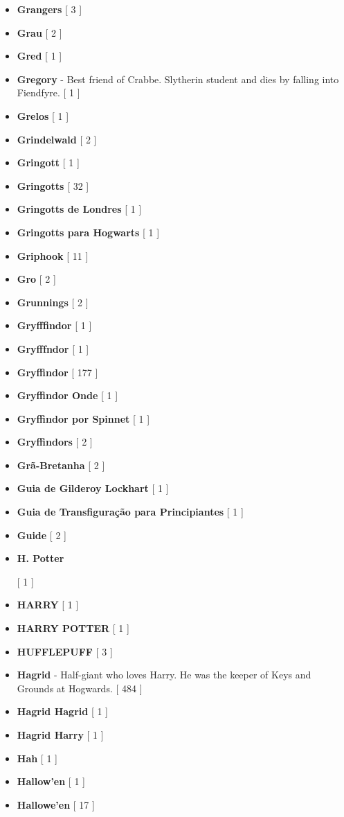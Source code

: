 \documentclass[a4paper]{article}
\begin{document}
{\begin{itemize}
	\item \textbf{Grangers} [ 3 ]
	\item \textbf{Grau} [ 2 ]
	\item \textbf{Gred} [ 1 ]
	\item \textbf{Gregory} - Best friend of Crabbe. Slytherin student and dies by falling into Fiendfyre. [ 1 ]
	\item \textbf{Grelos} [ 1 ]
	\item \textbf{Grindelwald} [ 2 ]
	\item \textbf{Gringott} [ 1 ]
	\item \textbf{Gringotts} [ 32 ]
	\item \textbf{Gringotts de Londres} [ 1 ]
	\item \textbf{Gringotts para Hogwarts} [ 1 ]
	\item \textbf{Griphook} [ 11 ]
	\item \textbf{Gro} [ 2 ]
	\item \textbf{Grunnings} [ 2 ]
	\item \textbf{Gryfffindor} [ 1 ]
	\item \textbf{Gryfffndor} [ 1 ]
	\item \textbf{Gryffindor} [ 177 ]
	\item \textbf{Gryffindor Onde} [ 1 ]
	\item \textbf{Gryffindor por Spinnet} [ 1 ]
	\item \textbf{Gryffindors} [ 2 ]
	\item \textbf{Grã-Bretanha} [ 2 ]
	\item \textbf{Guia de Gilderoy Lockhart} [ 1 ]
	\item \textbf{Guia de Transfiguração para Principiantes} [ 1 ]
	\item \textbf{Guide} [ 2 ]
	\item \hypertarget{H}{\textbf{H. Potter}} [ 1 ]
	\item \textbf{HARRY} [ 1 ]
	\item \textbf{HARRY POTTER} [ 1 ]
	\item \textbf{HUFFLEPUFF} [ 3 ]
	\item \textbf{Hagrid} - Half-giant who loves Harry. He was the keeper of Keys and Grounds at Hogwards. [ 484 ]
	\item \textbf{Hagrid Hagrid} [ 1 ]
	\item \textbf{Hagrid Harry} [ 1 ]
	\item \textbf{Hah} [ 1 ]
	\item \textbf{Hallow'en} [ 1 ]
	\item \textbf{Hallowe'en} [ 17 ]

\end{itemize}}
\end{document}
